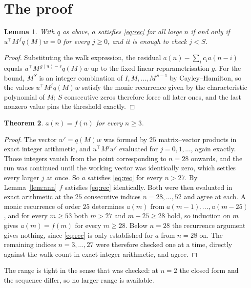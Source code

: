 \documentclass[11pt,a4paper]{article}
\theoremstyle{plain}
\newtheorem{theorem}{Theorem}
\newtheorem{lemma}[theorem]{Lemma}
\theoremstyle{definition}
\begin{document}
\section{The proof}

\begin{lemma}\label{lem:crit}
With $q$ as above, $a$ satisfies \eqref{eq:rec} for all large $n$ if and only if
$u^{\!\top}M^{\,j}q(M)w=0$ for every $j\ge0$, and it is enough to check $j<S$.
\end{lemma}

\begin{proof}
Substituting the walk expression, the residual $a(n)-\sum_ic_ia(n-i)$ equals
$u^{\!\top}M^{\,g(n)-r}q(M)w$ up to the fixed linear reparametrisation $g$. For the bound,
$M^{S}$ is an integer combination of $I,M,\dots,M^{S-1}$ by Cayley--Hamilton, so the values
$u^{\!\top}M^{j}q(M)w$ satisfy the monic recurrence given by the characteristic polynomial of
$M$; $S$ consecutive zeros therefore force all later ones, and the last nonzero value pins the
threshold exactly.
\end{proof}

\begin{theorem}
$a(n)=f(n)$ for every $n\ge3$.
\end{theorem}

\begin{proof}
The vector $w'=q(M)w$ was formed by $25$ matrix--vector products in exact integer
arithmetic, and $u^{\!\top}M^{j}w'$ evaluated for $j=0,1,\dots$, again exactly. Those integers
vanish from the point corresponding to $n=28$ onwards, and the run was continued until the
working vector was identically zero, which settles every larger $j$ at once. So $a$ satisfies
\eqref{eq:rec} for every $n>27$. By Lemma~\ref{lem:ann} $f$ satisfies \eqref{eq:rec}
identically. Both were then evaluated in exact arithmetic at the $25$ consecutive indices
$n=28,\dots,52$ and agree at each. A monic recurrence of order $25$
determines $a(m)$ from $a(m-1),\dots,a(m-25)$, and for every $m\ge53$ both
$m>27$ and $m-25\ge28$ hold, so induction on $m$ gives $a(m)=f(m)$ for every
$m\ge28$.
Below $n=28$ the recurrence argument gives nothing, since \eqref{eq:rec} is only
established for $a$ from $n=28$ on. The remaining indices $n=3,\dots,27$ were
therefore checked one at a time, directly against the walk count in exact integer arithmetic,
and agree.
\end{proof}

The range is tight in the sense that was checked: at $n=2$ the closed form and the sequence differ, so no larger range is available.
\end{document}
